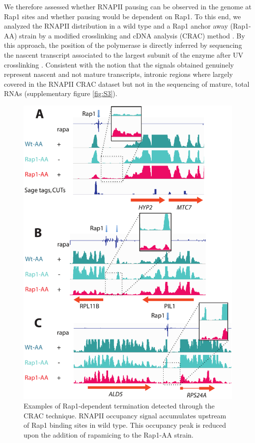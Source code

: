 We therefore assessed whether RNAPII pausing can be observed in the \cer{} genome at Rap1 sites and whether pausing would be dependent on Rap1. To this end, we analyzed the RNAPII distribution in a wild type and a Rap1 anchor away (Rap1-AA) strain by a modified crosslinking and cDNA analysis (CRAC) method \cite{bohnsack:2012:identification, granneman:2009:identification}. By this approach, the position of the polymerase is directly inferred by sequencing the nascent transcript associated to the largest subunit of the enzyme after \invivo{} UV crosslinking \cite{milligan:2016:strandspecific}. Consistent with the notion that the signals obtained genuinely represent nascent and not mature transcripts, intronic regions where largely covered in the RNAPII CRAC dataset but not in the sequencing of mature, total RNAs (supplementary figure \ref{fig:S3}).

\begin{figure}[hp!]

\centering
\includegraphics[width=\textwidth]{figures/results/rap/three.pdf}
\caption[Examples of Rap1-dependent termination detected \invivo{}]{Examples of Rap1-dependent termination detected \invivo{} through the CRAC technique. RNAPII occupancy signal accumulates upstream of Rap1 binding sites in wild type. This occupancy peak is reduced upon the addition of rapamicing to the Rap1-AA strain.}
\label{fig:three}

\end{figure}

